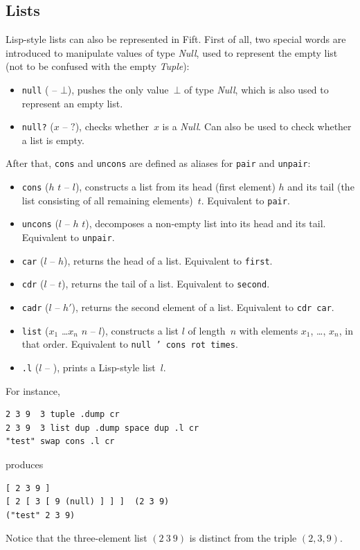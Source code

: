 \documentclass[12pt,oneside]{article}
\def\mysubsection#1{\subsection{#1}\fancyhead[C]{\small{\textsc{\textrm{\thesubsection.} #1}}}}
\begin{document}
\mysubsection{Lists}\label{p:lists}
Lisp-style lists can also be represented in Fift. First of all, two special words are introduced to manipulate values of type {\em Null}, used to represent the empty list (not to be confused with the empty {\em Tuple}):
\begin{itemize}
\item {\tt null} ( -- $\bot$), pushes the only value~$\bot$ of type {\em Null}, which is also used to represent an empty list.
\item {\tt null?} ($x$ -- $?$), checks whether~$x$ is a {\em Null}. Can also be used to check whether a list is empty.
\end{itemize}
After that, {\tt cons} and {\tt uncons} are defined as aliases for {\tt pair} and {\tt unpair}:
\begin{itemize}
\item {\tt cons} ($h$ $t$ -- $l$), constructs a list from its head (first element) $h$ and its tail (the list consisting of all remaining elements)~$t$. Equivalent to {\tt pair}.
\item {\tt uncons} ($l$ -- $h$ $t$), decomposes a non-empty list into its head and its tail. Equivalent to {\tt unpair}.
\item {\tt car} ($l$ -- $h$), returns the head of a list. Equivalent to {\tt first}.
\item {\tt cdr} ($l$ -- $t$), returns the tail of a list. Equivalent to {\tt second}.
\item {\tt cadr} ($l$ -- $h'$), returns the second element of a list. Equivalent to {\tt cdr car}.
\item {\tt list} ($x_1$ \dots $x_n$ $n$ -- $l$), constructs a list $l$ of length~$n$ with elements $x_1$, \ldots, $x_n$, in that order. Equivalent to {\tt null ' cons rot times}.
\item {\tt .l} ($l$ -- ), prints a Lisp-style list~$l$.
\end{itemize}
For instance,
\begin{verbatim}
2 3 9  3 tuple .dump cr
2 3 9  3 list dup .dump space dup .l cr
"test" swap cons .l cr
\end{verbatim}
produces
\begin{verbatim}
[ 2 3 9 ]
[ 2 [ 3 [ 9 (null) ] ] ]  (2 3 9)
("test" 2 3 9)
\end{verbatim}
Notice that the three-element list $(2\ 3\ 9)$ is distinct from the triple $(2,3,9)$.
\end{document}
